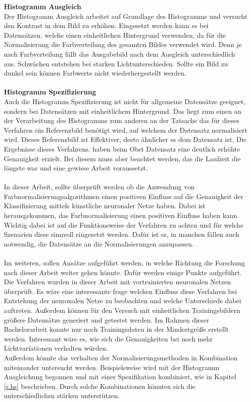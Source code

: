 \textbf{Histogramm Ausgleich}\\
Der Histogramm Ausgleich arbeitet auf Grundlage des Histogramms und versucht den Kontrast in dem Bild zu erhöhen. Eingesetzt werden kann es bei Datensätzen, welche einen einheitlichen Hintergrund verwenden, da für die Normalisierung die Farbverteilung des gesamten Bildes verwendet wird. Denn je nach Farbverteilung fällt das Ausgabebild nach dem Ausgleich unterschiedlich aus. Schwächen entstehen bei starken Lichtunterschieden. Sollte ein Bild zu dunkel sein können Farbwerte nicht wiederhergestellt werden.\\\\
\textbf{Histogramm Spezifizierung}\\
Auch die Histogramm Spezifizierung ist nicht für allgemeine Datensätze geeignet, sondern bei Datensätzen mit einheitlichem Hintergrund. Das liegt zum einen an der Verarbeitung des Histogramms zum anderen an der Tatsache das für dieses Verfahren ein Referenzbild benötigt wird, auf welchem der Datensatz normalisiert wird. Dieses Referenzbild ist Effektiver, desto ähnlicher es dem Datensatz ist. Die Ergebnisse dieses Verfahrens, haben beim Obst Datensatz eine deutlich erhöhte Genauigkeit erzielt. Bei diesem muss aber beachtet werden, das die Laufzeit die längste war und eine gewisse Arbeit voraussetzt.\\\\
In dieser Arbeit, sollte überprüft werden ob die Anwendung von Farbnormalisierungsalgorithmen einen positiven Einfluss auf die Genauigkeit der Klassifizierung mittels künstliche neuronaler Netze haben. Dabei ist herausgekommen, das Farbnormalisierung einen positiven Einfluss haben kann. Wichtig dabei ist auf die Funktionsweise der Verfahren zu achten und für welche Szenarien diese sinnvoll eingesetzt werden. Dafür ist es, in manchen fällen auch notwendig, die Datensätze an die Normalisierungen anzupassen.\\\\
Im  weiteren, sollen Ansätze aufgeführt werden, in welche Richtung die Forschung nach dieser Arbeit weiter gehen könnte. Dafür werden einige Punkte aufgeführt. Die Verfahren wurden in dieser Arbeit mit vortrainierten neuronalen Netzen überprüft. Es wäre eine interessante frage welchen Einfluss diese Verfahren bei Entstehung der neuronalen Netze zu beobachten und welche Unterschiede dabei auftreten. Außerdem können für den Versuch mit einheitlichen Trainingsbildern größere Datensätze generiert und getestet werden. Im Rahmen dieser Bachelorarbeit konnte nur noch Trainingsdaten in der Mindestgröße erstellt werden. Interessant wäre es, wie sich die Genauigkeiten bei noch mehr Lichtvariationen verhalten würden.\\
Außerdem könnte das verhalten der Normalisierungsmethoden in Kombination miteinander untersucht werden. Beispielsweise wird mit der Histogramm Ausgleichung begonnen und mit einer Spezifikation kombiniert, wie in Kapitel \ref{s.hs} beschrieben. Durch solche Kombinationen könnten sich die unterschiedlichen stärken unterstützen.  